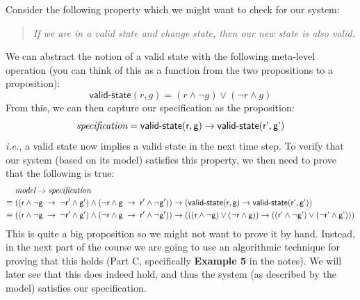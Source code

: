 \documentclass{article}
\theoremstyle{definition}
\newcommand{\ie}{\emph{i.e.}}
\begin{document}
Consider the following property which we might want to check
for our system:
%
\begin{quote}
\emph{If we are in a valid state and change state, then our new state
  is also valid.}
\end{quote}
%
We can abstract the notion of a valid state with the following
meta-level operation (you can think of this as a function from the
two propositions to a proposition):
%
\begin{equation*}
\textsf{valid-state}(r, g) = (r \wedge \neg g) \vee (\neg r \wedge g)
\end{equation*}
%
From this, we can then capture our specification as the proposition:
%
\begin{equation*}
  \textit{specification} = \textsf{valid-state}(\textsf{r}, \textsf{g})
  \rightarrow \textsf{valid-state}(\textsf{r'}, \textsf{g'})
\end{equation*}
%
\ie{}, a valid state now implies a valid state in the next time step.
To verify that our system (based on its model) satisfies this
property, we then need to prove that the following is true:
%
\begin{align*}
 & \textit{model} \rightarrow \textit{specification} \\
  \equiv \; &
((\textsf{r}{} \wedge \neg\textsf{g}{} \; \rightarrow \; \neg\textsf{r}{}' \wedge
\textsf{g}{}')
\wedge
(\neg\textsf{r}{} \wedge \textsf{g}{} \; \rightarrow \; \textsf{r}{}' \wedge
  \neg\textsf{g}{}'))
  \rightarrow
   (\textsf{valid-state}(\textsf{r}, \textsf{g})
           \rightarrow \textsf{valid-state}(\textsf{r'}, \textsf{g'})) \\
  \equiv \; &
((\textsf{r}{} \wedge \neg\textsf{g}{} \; \rightarrow \; \neg\textsf{r}{}' \wedge
\textsf{g}{}')
\wedge
(\neg\textsf{r}{} \wedge \textsf{g}{} \; \rightarrow \; \textsf{r}{}' \wedge
  \neg\textsf{g}{}'))
              \rightarrow
              (((\textsf{r} \wedge \neg \textsf{g}) \vee (\neg \textsf{r} \wedge \textsf{g}))
              \rightarrow ((\textsf{r'} \wedge \neg \textsf{g'}) \vee (\neg \textsf{r'} \wedge \textsf{g'})))
\end{align*}
%
This is quite a big proposition so we might not want to prove it by
hand. Instead, in the next part of the course we are going to use an
algorithmic technique for proving that this holds (Part C,
specifically \textbf{Example 5} in the notes). We will later see that
this does indeed hold, and thus the system (as described by the model)
satisfies our specification.
\end{document}
